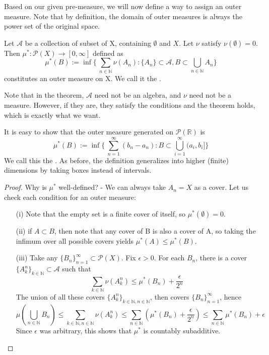 \documentclass[11pt]{scrartcl}
\begin{document}
Based on our given pre-measure, we will now define a way to assign an outer measure. Note that by definition, the domain of outer measures is always the power set of the original space.

\begin{theorem}
Let $\mathcal{A}$ be a collection of subset of X, containing $\emptyset$ and $X$. Let $\nu$ satisfy $\nu(\emptyset) = 0 $. Then $\mu^*: \mathcal{P}(X) \rightarrow [0,\infty]$ defined as 
$$\mu^*(B) := 
\inf \{\ \sum_{n \in \mathbb{N}} \nu(A_n) :  \{A_n\} \subset \mathcal{A}, B \subset \bigcup_{n\in \mathbb{N}} A_n  \}$$
constitutes an outer measure on X. We call it the .
\end{theorem}

\begin{remark}
Note that in the theorem, $\mathcal{A}$ need not be an algebra, and $\nu$ need not be a measure. However, if they are, they satisfy the conditions and the theorem holds, which is exactly what we want.
\end{remark}


\begin{example}
It is easy to show that the outer measure generated on $\mathcal{P}(\mathbb{R})$ is 
$$\mu^*(B) := 
\inf \{\ \sum_{n=1}^\infty (b_n - a_n) :  B \subset  \bigcup_{i=1}^\infty (a_i,b_i]  \}$$
We call this the . As before, the definition generalizes into higher (finite) dimensions by taking boxes instead of intervals.
\end{example}


\begin{proof}
Why is $\mu^*$ well-defined? - We can always take $A_n = X$ as a cover.
Let us check each condition for an outer measure:
\begin{itemize}
\item[(i)] Note that the empty set is a finite cover of itself, so $\mu^*(\emptyset) = 0$.
\item[(ii)] if $ A \subset B$, then note that any cover of B is also a cover of A, so taking the infimum over all possible covers yields $\mu^*(A)\leq \mu^*(B)$.
\item[(iii)] Take any $\{B_n\}_{n=1}^\infty \subset \mathcal{P}(X)$. Fix $\epsilon >0$. For each $B_n$, there is a cover  $\{A_{k}^n\}_{k\in \mathbb{N}}\subset \mathcal{A}$ such that 
$$\sum_{k \in \mathbb{N}} \nu(A_k^n) \leq \mu^*(B_n) + \frac{\epsilon}{2^n}$$
The union of all these covers $\{A_{k}^n\}_{k\in \mathbb{N},n\in \mathbb{N}}$, then covers $\{B_n\}_{n=1}^\infty$, hence 
$$\mu(\bigcup_{n\in \mathbb{N}} B_n ) \leq \sum_{k \in \mathbb{N},n \in \mathbb{N}} \nu(A_k^n) \leq \sum_{n \in \mathbb{N}} (\mu^*(B_n) + \frac{\epsilon}{2^n})
\leq \sum_{n \in \mathbb{N}} \mu^*(B_n) + \epsilon $$
Since $\epsilon$ was arbitrary, this shows that $\mu^*$ is countably subadditive.
\end{itemize}

\end{proof}
\end{document}

